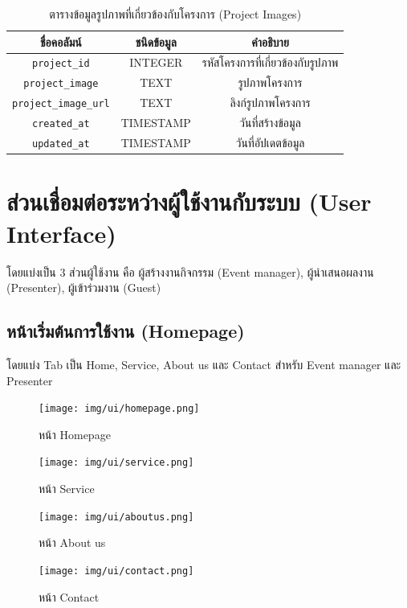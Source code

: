 \begin{table}[hb]
    \centering
    \begin{tabular}{|c|c|c|}
        \hline
        ชื่อคอลัมน์                   & ชนิดข้อมูล   & คำอธิบาย                    \\ \hline
        \verb |project_id|        & INTEGER   & รหัสโครงการที่เกี่ยวข้องกับรูปภาพ \\ \hline
        \verb |project_image|     & TEXT      & รูปภาพโครงการ              \\ \hline
        \verb |project_image_url| & TEXT      & ลิงก์รูปภาพโครงการ           \\ \hline
        \verb |created_at|        & TIMESTAMP & วันที่สร้างข้อมูล               \\ \hline
        \verb |updated_at|        & TIMESTAMP & วันที่อัปเดตข้อมูล              \\ \hline
    \end{tabular}
    \caption{ตารางข้อมูลรูปภาพที่เกี่ยวข้องกับโครงการ (Project Images)}
    \label{tab:project_images_data}
\end{table}

\clearpage %
\section{ส่วนเชื่อมต่อระหว่างผู้ใช้งานกับระบบ (User Interface)}


โดยแบ่งเป็น 3 ส่วนผู้ใช้งาน คือ ผู้สร้างงานกิจกรรม (Event manager), ผู้นำเสนอผลงาน (Presenter), ผู้เข้าร่วมงาน (Guest)
\subsection{หน้าเริ่มต้นการใช้งาน (Homepage)}
โดยแบ่ง Tab เป็น Home, Service, About us และ Contact สำหรับ Event manager และ Presenter

\begin{figure}[h!] %
    \begin{center}
        \texttt{[image: img/ui/homepage.png]}
    \end{center}
    \caption{หน้า Homepage}
    \label{fig:homepage}

    \begin{center}
        \texttt{[image: img/ui/service.png]}
    \end{center}
    \caption{หน้า Service}
    \label{fig:service}
\end{figure}


\begin{figure}
    \begin{center}
        \texttt{[image: img/ui/aboutus.png]}
    \end{center}
    \caption{หน้า About us}
    \label{fig:aboutus}

    \begin{center}
        \texttt{[image: img/ui/contact.png]}
    \end{center}
    \caption{หน้า Contact}
    \label{fig:contact}
\end{figure}

